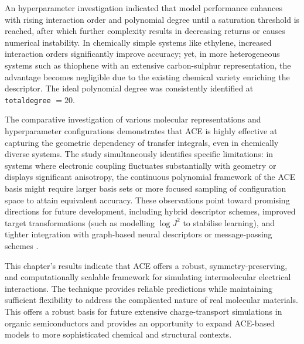  An hyperparameter investigation indicated that model performance enhances with rising interaction order and polynomial degree until a saturation threshold is reached, after which further complexity results in decreasing returns or causes numerical instability.  In chemically simple systems like ethylene, increased interaction orders significantly improve accuracy; yet, in more heterogeneous systems such as thiophene with an extensive carbon-sulphur representation, the advantage becomes negligible due to the existing chemical variety enriching the descriptor.  The ideal polynomial degree was consistently identified at \texttt{totaldegree} \(= 20\).

The comparative investigation of various molecular representations and hyperparameter configurations demonstrates that ACE is highly effective at capturing the geometric dependency of transfer integrals, even in chemically diverse systems. The study simultaneously identifies specific limitations: in systems where electronic coupling fluctuates substantially with geometry or displays significant anisotropy, the continuous polynomial framework of the ACE basis might require larger basis sets or more focused sampling of configuration space to attain equivalent accuracy. These observations point toward promising directions for future development, including hybrid descriptor schemes, improved target transformations (such as modelling $\log J^{2}$ to stabilise learning), and tighter integration with graph-based neural descriptors or message-passing schemes \cite{https://doi.org/10.48550/arxiv.2206.07697, Batatia2025}.

This chapter's results indicate that ACE offers a robust, symmetry-preserving, and computationally scalable framework for simulating intermolecular electrical interactions.  The technique provides reliable predictions while maintaining sufficient flexibility to address the complicated nature of real molecular materials.  This offers a robust basis for future extensive charge-transport simulations in organic semiconductors and provides an opportunity to expand ACE-based models to more sophisticated chemical and structural contexts.
